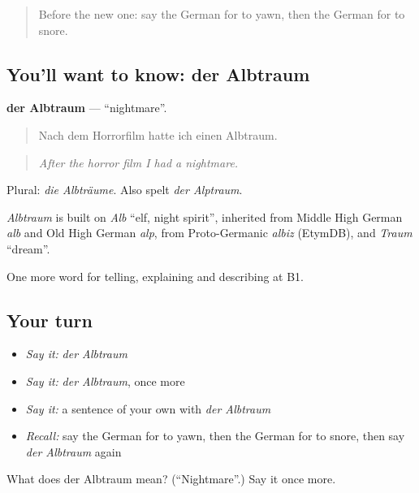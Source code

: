 \label{lesson:GE-C486-albtraum}



\begin{quote}
Before the new one: say the German for to yawn, then the German for to snore.
\end{quote}

\subsection*{You'll want to know: der Albtraum}
\textbf{der Albtraum} — \textquotedblleft{}nightmare\textquotedblright{}.

\begin{quote}
Nach dem Horrorfilm hatte ich einen Albtraum.
\end{quote}

\begin{quote}
\emph{After the horror film I had a nightmare.}
\end{quote}

Plural: \emph{die Albträume}. Also spelt \emph{der Alptraum}.

\begin{cousinweb}
\emph{Albtraum} is built on \emph{Alb} \textquotedblleft{}elf, night spirit\textquotedblright{}, inherited from Middle High German \emph{alb} and Old High German \emph{alp}, from Proto-Germanic \emph{albiz} (EtymDB), and \emph{Traum} \textquotedblleft{}dream\textquotedblright{}.
\end{cousinweb}

\begin{grammarlens}[title={What you've built}]
One more word for telling, explaining and describing at B1.
\end{grammarlens}

\subsection*{Your turn}
\begin{itemize}
\raggedright
  \item \emph{Say it:} \emph{der Albtraum}
  \item \emph{Say it:} \emph{der Albtraum}, once more
  \item \emph{Say it:} a sentence of your own with \emph{der Albtraum}
  \item \emph{Recall:} say the German for to yawn, then the German for to snore, then say \emph{der Albtraum} again
\end{itemize}

\begin{tcolorbox}[breakable,colback=teal!4,colframe=teal!35!black,title={Before you move on}]
What does der Albtraum mean? (\textquotedblleft{}Nightmare\textquotedblright{}.) Say it once more.
\end{tcolorbox}

